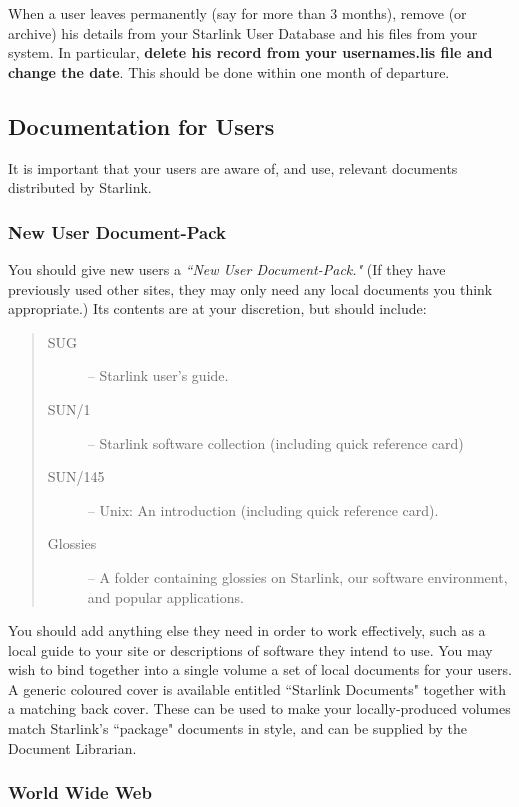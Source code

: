 \documentclass[twoside,11pt]{article}
\newcommand{\xref}[3]{#1}
\begin{document}
When a user leaves permanently (say for more than 3 months), remove (or archive)
his details from your Starlink User Database and his files from your system.
In particular, {\bf delete his record from your usernames.lis file and change
the date}.
This should be done within one month of departure.

\subsection{Documentation for Users}

It is important that your users are aware of, and use, relevant documents
distributed by Starlink.

\subsubsection{\label{NUDP}New User Document-Pack}

You should give new users a {\em ``New User Document-Pack."}
(If they have previously used other sites, they may only need any local
documents you think appropriate.)
Its contents are at your discretion, but should include:

\begin{quote}
\begin{description}
\item [\xref{SUG}{sug}{}] -- Starlink user's guide.
\item [\xref{SUN/1}{sun1}{}] -- Starlink software collection (including
quick reference card)
\item [\xref{SUN/145}{sun145}{}] -- Unix: An introduction (including quick
reference card).
\item [Glossies] -- A folder containing glossies on Starlink, our software
 environment, and popular applications.
\end{description}
\end{quote}

You should add anything else they need in order to work effectively, such
as a local guide to your site or descriptions of software they intend to use.
You may wish to bind together into a single volume a set of local documents
for your users.
A generic coloured cover is available entitled ``Starlink Documents" together
with a matching back cover.
These can be used to make your locally-produced volumes match Starlink's
``package" documents in style, and can be supplied by the Document Librarian.
 
\subsubsection{World Wide Web}
\end{document}

